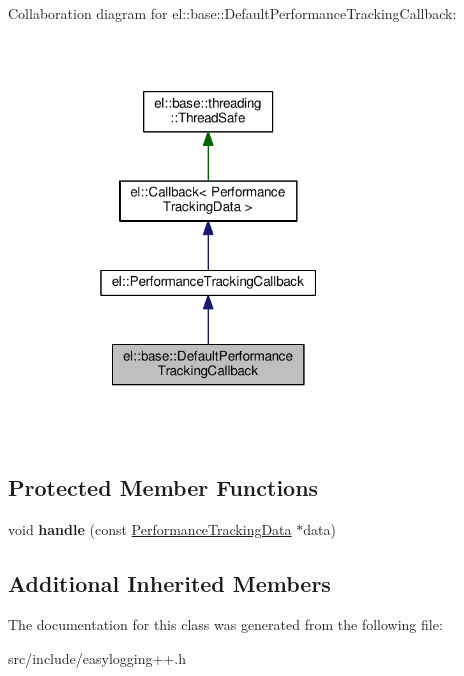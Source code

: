 Collaboration diagram for el\+:\+:base\+:\+:Default\+Performance\+Tracking\+Callback\+:
\nopagebreak
\begin{figure}[H]
\begin{center}
\leavevmode
\includegraphics[width=241pt]{classel_1_1base_1_1_default_performance_tracking_callback__coll__graph}
\end{center}
\end{figure}
\subsection*{Protected Member Functions}
\begin{DoxyCompactItemize}
\item 
\mbox{\label{classel_1_1base_1_1_default_performance_tracking_callback_afabb8820e1bd9a7fb89508fe11f59d37}} 
void {\bfseries handle} (const \hyperlink{classel_1_1_performance_tracking_data}{Performance\+Tracking\+Data} $\ast$data)
\end{DoxyCompactItemize}
\subsection*{Additional Inherited Members}


The documentation for this class was generated from the following file\+:\begin{DoxyCompactItemize}
\item 
src/include/easylogging++.\+h\end{DoxyCompactItemize}
